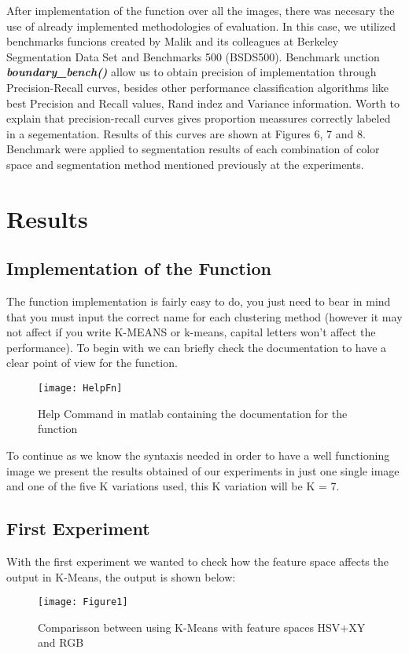 \documentclass[10pt,twocolumn,letterpaper]{article}
\begin{document}
After implementation of the function over all the images, there was necesary the use of already implemented methodologies of evaluation. In this case, we utilized benchmarks funcions created by Malik and its colleagues at Berkeley Segmentation Data Set and Benchmarks 500 (BSDS500). Benchmark unction \textbf{\textit{boundary\_bench()}} allow us to obtain precision of implementation through Precision-Recall curves, besides other performance classification algorithms like best Precision and Recall values, Rand indez and Variance information. Worth to explain that precision-recall curves gives proportion meassures correctly labeled in a segementation. Results of this curves are shown at Figures 6, 7 and 8. Benchmark were applied to segmentation results of each combination of color space and segmentation method mentioned previously at the experiments.

\section{Results}

\subsection{Implementation of the Function}
The function implementation is fairly easy to do, you just need to bear in mind that you must input the correct name for each clustering method (however it may not affect if you write K-MEANS or k-means, capital letters won't affect the performance). To begin with we can briefly check the documentation to have a clear point of view for the function.
\begin{figure}[h]
    \texttt{[image: HelpFn]}
    \caption{Help Command in matlab containing the documentation for the function}
\end{figure}
To continue  as we know the syntaxis needed in order to have a well functioning image we present the results obtained of our experiments in just one single image and one of the five K variations used, this K variation will be K = 7.

\subsection{First Experiment}
With the first experiment we wanted to check how the feature space affects the output in K-Means, the output is shown below:
\begin{figure}[h]
    \texttt{[image: Figure1]}
    \caption{Comparisson between using K-Means with feature spaces HSV+XY and RGB}
\end{figure}
\end{document}
